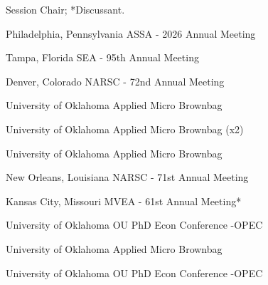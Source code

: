\textdagger Session Chair; *Discussant.


{%
	Philadelphia, Pennsylvania}
{%
	ASSA - 2026 Annual Meeting\ec}
{}


{%
	Tampa, Florida}
{%
	SEA - 95th Annual Meeting}


{%
	Denver, Colorado}
{%
	NARSC - 72nd Annual Meeting}
{}
{}

{%
	University of Oklahoma}
{%
	Applied Micro Brownbag}
{}

{%
	University of Oklahoma}
{%
	Applied Micro Brownbag (x2)}
{}

{%
	University of Oklahoma}
{%
	Applied Micro Brownbag}
{}

{%
	New Orleans, Louisiana}
{%
	NARSC - 71st Annual Meeting\ec}
{}

{%
	Kansas City, Missouri}
{%
	MVEA - 61st Annual Meeting*}
{}


{%
	University of Oklahoma}
{%
	OU PhD Econ Conference -OPEC}
{}

{%
	University of Oklahoma}
{%
	Applied Micro Brownbag}
{}

{%
	University of Oklahoma}
{%
	OU PhD Econ Conference -OPEC}
{}